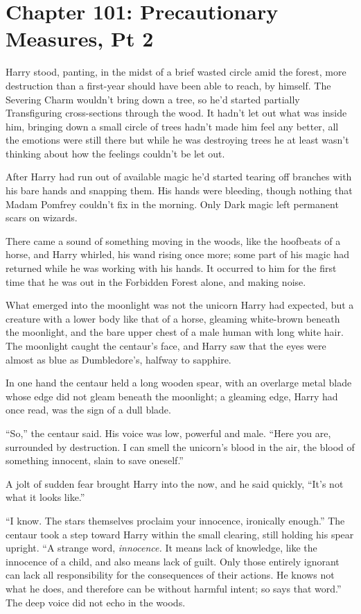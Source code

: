 \chapter{Chapter 101: Precautionary Measures, Pt 2}
Harry stood, panting, in the midst of a brief wasted circle amid the forest, more destruction than a first-year should have been able to reach, by himself. The Severing Charm wouldn't bring down a tree, so he'd started partially Transfiguring cross-sections through the wood. It hadn't let out what was inside him, bringing down a small circle of trees hadn't made him feel any better, all the emotions were still there but while he was destroying trees he at least wasn't thinking about how the feelings couldn't be let out.

After Harry had run out of available magic he'd started tearing off branches with his bare hands and snapping them. His hands were bleeding, though nothing that Madam Pomfrey couldn't fix in the morning. Only Dark magic left permanent scars on wizards.

There came a sound of something moving in the woods, like the hoofbeats of a horse, and Harry whirled, his wand rising once more; some part of his magic had returned while he was working with his hands. It occurred to him for the first time that he was out in the Forbidden Forest alone, and making noise.

What emerged into the moonlight was not the unicorn Harry had expected, but a creature with a lower body like that of a horse, gleaming white-brown beneath the moonlight, and the bare upper chest of a male human with long white hair. The moonlight caught the centaur's face, and Harry saw that the eyes were almost as blue as Dumbledore's, halfway to sapphire.

In one hand the centaur held a long wooden spear, with an overlarge metal blade whose edge did not gleam beneath the moonlight; a gleaming edge, Harry had once read, was the sign of a dull blade.

``So,'' the centaur said. His voice was low, powerful and male. ``Here you are, surrounded by destruction. I can smell the unicorn's blood in the air, the blood of something innocent, slain to save oneself.''

A jolt of sudden fear brought Harry into the now, and he said quickly, ``It's not what it looks like.''

``I know. The stars themselves proclaim your innocence, ironically enough.'' The centaur took a step toward Harry within the small clearing, still holding his spear upright. ``A strange word, \emph{innocence.} It means lack of knowledge, like the innocence of a child, and also means lack of guilt. Only those entirely ignorant can lack all responsibility for the consequences of their actions. He knows not what he does, and therefore can be without harmful intent; so says that word.'' The deep voice did not echo in the woods.

